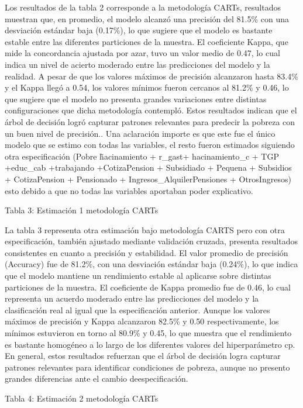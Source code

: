 \documentclass[12pt,a4paper,onecolumn]{article}
\begin{document}
Los resultados de la tabla 2 corresponde a la metodología CARTs, resultados muestran que, en promedio, el modelo alcanzó una precisión del 81.5\% con una desviación estándar baja (0.17\%), lo que sugiere que el modelo es bastante estable entre las diferentes particiones de la muestra. El coeficiente Kappa, que mide la concordancia ajustada por azar, tuvo un valor medio de 0.47, lo cual indica un nivel de acierto moderado entre las predicciones del modelo y la realidad. A pesar de que los valores máximos de precisión alcanzaron hasta 83.4\% y el Kappa llegó a 0.54, los valores mínimos fueron cercanos al 81.2\% y 0.46, lo que sugiere que el modelo no presenta grandes variaciones entre distintas configuraciones que dicha metodología contempló. Estos resultados indican que el árbol de decisión logró capturar patrones relevantes para predecir la pobreza con un buen nivel de precisión.. Una aclaración importe es que este fue el único modelo que se estimo con todas las variables, el resto fueron estimados siguiendo otra especificación (Pobre \~ hacinamiento + r\_gast+ hacinamiento\_c + TGP +educ\_cab +trabajando +CotizaPension + Subsidiado + Pequena + Subsidios + CotizaPension + Pensionado + Ingresos\_AlquilerPensiones + OtrosIngresos) esto debido a que no todas las variables aportaban poder explicativo.

{\color{blue} Tabla 3: Estimación 1 metodología CARTs}

La tabla 3 representa otra estimación bajo metodología CARTS pero con otra especificación, también ajustado mediante validación cruzada, presenta resultados consistentes en cuanto a precisión y estabilidad. El valor promedio de precisión (Accuracy) fue de 81.2\%, con una desviación estándar baja (0.24\%), lo que indica que el modelo mantiene un rendimiento estable al aplicarse sobre distintas particiones de la muestra. El coeficiente de Kappa promedio fue de 0.46, lo cual representa un acuerdo moderado entre las predicciones del modelo y la clasificación real al igual que la especificación anterior. Aunque los valores máximos de precisión y Kappa alcanzaron 82.5\% y 0.50 respectivamente, los mínimos estuvieron en torno al 80.9\% y 0.45, lo que muestra que el rendimiento es bastante homogéneo a lo largo de los diferentes valores del hiperparámetro cp. En general, estos resultados refuerzan que el árbol de decisión logra capturar patrones relevantes para identificar condiciones de pobreza, aunque no presento grandes diferencias ante el cambio deespecificación.

{\color{blue} Tabla 4: Estimación 2 metodología CARTs}
\end{document}
